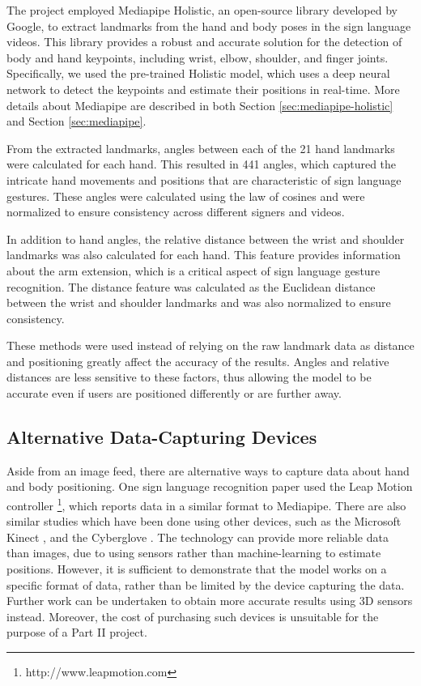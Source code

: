 \documentclass[final,rdr32.tex]{subfiles}
\begin{document}
The project employed Mediapipe Holistic, an open-source library developed by Google, to extract landmarks from the hand and body poses in the sign language videos. This library provides a robust and accurate solution for the detection of body and hand keypoints, including wrist, elbow, shoulder, and finger joints. Specifically, we used the pre-trained Holistic model, which uses a deep neural network to detect the keypoints and estimate their positions in real-time. More details about Mediapipe are described in both Section \ref{sec:mediapipe-holistic} and Section \ref{sec:mediapipe}.

From the extracted landmarks, angles between each of the 21 hand landmarks were calculated for each hand. This resulted in 441 angles, which captured the intricate hand movements and positions that are characteristic of sign language gestures. These angles were calculated using the law of cosines and were normalized to ensure consistency across different signers and videos.

In addition to hand angles, the relative distance between the wrist and shoulder landmarks was also calculated for each hand. This feature provides information about the arm extension, which is a critical aspect of sign language gesture recognition. The distance feature was calculated as the Euclidean distance between the wrist and shoulder landmarks and was also normalized to ensure consistency.

These methods were used instead of relying on the raw landmark data as distance and positioning greatly affect the accuracy of the results. Angles and relative distances are less sensitive to these factors, thus allowing the model to be accurate even if users are positioned differently or are further away.

\subsection{Alternative Data-Capturing Devices}

Aside from an image feed, there are alternative ways to capture data about hand and body positioning. One sign language recognition paper \cite{chuan2014american} used the Leap Motion controller \footnote{http://www.leapmotion.com}, which reports data in a similar format to Mediapipe. There are also similar studies which have been done using other devices, such as the Microsoft Kinect \cite{lang2012sign}, and the Cyberglove \cite{wang2006american}. The technology can provide more reliable data than images, due to using sensors rather than machine-learning to estimate positions. However, it is sufficient to demonstrate that the model works on a specific format of data, rather than be limited by the device capturing the data. Further work can be undertaken to obtain more accurate results using 3D sensors instead. Moreover, the cost of purchasing such devices is unsuitable for the purpose of a Part II project.
\end{document}
